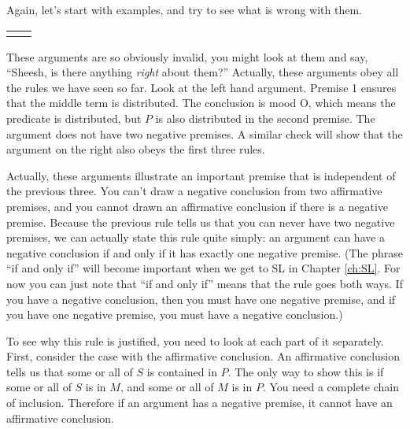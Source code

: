 Again, let's start with examples, and try to see what is wrong with them.

\begin{tabu}{p{.5\linewidth}p{.5\linewidth}}

\begin{kormanize}
\end{kormanize}

&

\begin{kormanize}
\end{kormanize}

\end{tabu}

These arguments are so obviously invalid, you might look at them and say, ``Sheesh, is there anything \emph{right} about them?'' Actually, these arguments obey all the rules we have seen so far. Look at the left hand argument. Premise 1 ensures that the middle term is distributed. The conclusion is mood O, which means the predicate is distributed, but $P$ is also distributed in the second premise. The argument does not have two negative premises. A similar check will show that the argument on the right also obeys the first three rules.

Actually, these arguments illustrate an important premise that is independent of the previous three. You can't draw a negative conclusion from two affirmative premises, and you cannot drawn an affirmative conclusion if there is a negative premise. Because the previous rule tells us that you can never have two negative premises, we can actually state this rule quite simply: an argument can have a negative conclusion if and only if it has exactly one negative premise. (The phrase ``if and only if'' will become important when we get to SL in Chapter \ref{ch:SL}. For now you can just note that ``if and only if'' means that the rule goes both ways. If you have a negative conclusion, then you must have one negative premise, and if you have one negative premise, you must have a negative conclusion.)

To see why this rule is justified, you need to look at each part of it separately. First, consider the case with the affirmative conclusion. An affirmative conclusion tells us that some or all of $S$ is contained in $P$. The only way to show this is if some or all of $S$ is in $M$, and some or all of $M$ is in $P$. You need a complete chain of inclusion. Therefore if an argument has a negative premise, it cannot have an affirmative conclusion.


